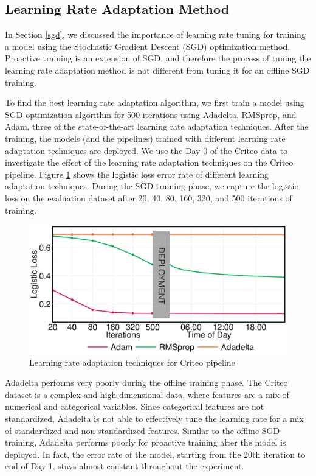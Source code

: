 \subsection{Learning Rate Adaptation Method}
In Section \ref{sgd}, we discussed the importance of learning rate tuning for training a model using the Stochastic Gradient Descent (SGD) optimization method.
Proactive training is an extension of SGD, and therefore the process of tuning the learning rate adaptation method is not different from tuning it for an offline SGD training.

To find the best learning rate adaptation algorithm, we first train a model using SGD optimization algorithm for 500 iterations using Adadelta, RMSprop, and Adam, three of the state-of-the-art learning rate adaptation techniques.
After the training, the models (and the pipelines) trained with different learning rate adaptation techniques are deployed.
We use the Day 0 of the Criteo data to investigate the effect of the learning rate adaptation techniques on the Criteo pipeline.
Figure \ref{fig:criteo-learning-rate} shows the logistic loss error rate of different learning adaptation techniques. 
During the SGD training phase, we capture the logistic loss on the evaluation dataset after 20, 40, 80, 160, 320, and 500 iterations of training.


\begin{figure}[h!]
\includegraphics[width=\columnwidth]{../images/experiment-results/criteo-learning-rate-experiment.pdf}
\caption{Learning rate adaptation techniques for Criteo pipeline}
\label{fig:criteo-learning-rate}
\end{figure}

Adadelta performs very poorly during the offline training phase.
The Criteo dataset is a complex and high-dimensional data, where features are a mix of numerical and categorical variables.
Since categorical features are not standardized, Adadelta is not able to effectively tune the learning rate for a mix of standardized and non-standardized features.
Similar to the offline SGD training, Adadelta performs poorly for proactive training after the model is deployed.
In fact, the error rate of the model, starting from the 20th iteration to end of Day 1, stays almost constant throughout the experiment.

